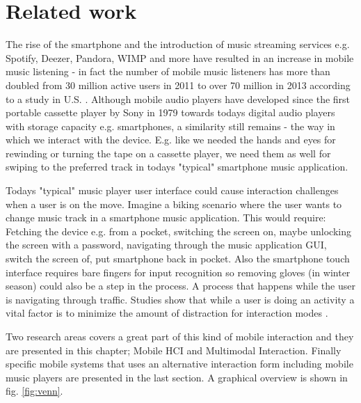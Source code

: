 \chapter{Related work}
The rise of the smartphone and the introduction of music streaming services e.g. Spotify, Deezer, Pandora, WIMP and more have resulted in an increase in mobile music listening - in fact the number of mobile music listeners has more than doubled from 30 million active users in 2011 to over 70 million in 2013 according to a study in U.S. \cite{emarketer_music_2014}. Although mobile audio players have developed since the first portable cassette player by Sony in 1979 towards todays digital audio players with storage capacity e.g. smartphones, a similarity still remains - the way in which we interact with the device. E.g. like we needed the hands and eyes for rewinding or turning the tape on a cassette player, we need them as well for swiping to the preferred track in todays "typical" smartphone music application.

Todays "typical" music player user interface could cause interaction challenges when a user is on the move. Imagine a biking scenario where the user wants to change music track in a smartphone music application. This would require: Fetching the device e.g. from a pocket, switching the screen on, maybe unlocking the screen with a password, navigating through the music application GUI, switch the screen of, put smartphone back in pocket. Also the smartphone touch interface requires bare fingers for input recognition so removing gloves (in winter season) could also be a step in the process. A process that happens while the user is navigating through traffic. Studies show that while a user is doing an activity a vital factor is to minimize the amount of distraction for interaction modes \cite{pascoe_using_2000}.

Two research areas covers a great part of this kind of mobile interaction and they are presented in this chapter; Mobile HCI and Multimodal Interaction. Finally specific mobile systems that uses an alternative interaction form including mobile music players are presented in the last section. A graphical overview is shown in fig. \ref{fig:venn}.


